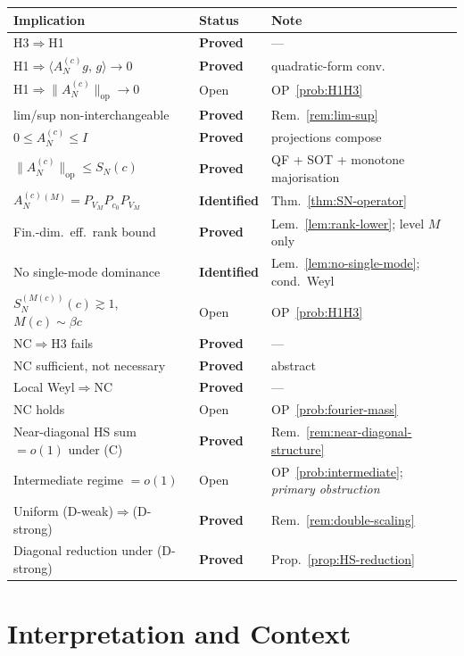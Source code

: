 \documentclass[12pt,a4paper]{amsart}
\theoremstyle{definition}
\theoremstyle{remark}
\newcommand{\norm}[1]{\|#1\|}
\newcommand{\ip}[2]{\langle #1,\, #2\rangle}
\newcommand{\Ac}{A_N^{(c)}}
\begin{document}
\begin{center}
\renewcommand{\arraystretch}{1.25}
\begin{tabular}{lll}
\toprule
Implication & Status & Note \\
\midrule
H3$\Rightarrow$H1
  & \textbf{Proved} & --- \\
H1$\Rightarrow\ip{\Ac g}{g}\to 0$
  & \textbf{Proved} & quadratic-form conv. \\
H1$\Rightarrow\norm{\Ac}_{\mathrm{op}}\to 0$
  & Open & OP~\ref{prob:H1H3} \\
lim/sup non-interchangeable
  & \textbf{Proved} & Rem.~\ref{rem:lim-sup} \\
$0\le\Ac\le I$
  & \textbf{Proved} & projections compose \\
$\norm{\Ac}_{\mathrm{op}}\le S_N(c)$
  & \textbf{Proved}
  & QF + SOT + monotone majorisation \\
$\Ac^{(M)}=P_{V_M}P_{c_0}P_{V_M}$
  & \textbf{Identified}
  & Thm.~\ref{thm:SN-operator} \\
Fin.-dim.\ eff.\ rank bound
  & \textbf{Proved}
  & Lem.~\ref{lem:rank-lower};
    level $M$ only \\
No single-mode dominance
  & \textbf{Identified}
  & Lem.~\ref{lem:no-single-mode};
    cond.\ Weyl \\
$S_N^{(M(c))}(c)\gtrsim 1$,
  $M(c)\sim\beta c$
  & Open
  & OP~\ref{prob:H1H3} \\
NC$\Rightarrow$H3 fails
  & \textbf{Proved} & --- \\
NC sufficient, not necessary
  & \textbf{Proved} & abstract \\
Local Weyl$\Rightarrow$NC
  & \textbf{Proved} & --- \\
NC holds
  & Open
  & OP~\ref{prob:fourier-mass} \\
Near-diagonal HS sum $=o(1)$ under (C)
  & \textbf{Proved}
  & Rem.~\ref{rem:near-diagonal-structure} \\
Intermediate regime $=o(1)$
  & Open
  & OP~\ref{prob:intermediate};
    \emph{primary obstruction} \\
Uniform (D-weak)$\Rightarrow$(D-strong)
  & \textbf{Proved}
  & Rem.~\ref{rem:double-scaling} \\
Diagonal reduction under (D-strong)
  & \textbf{Proved}
  & Prop.~\ref{prop:HS-reduction} \\
\bottomrule
\end{tabular}
\end{center}

\section{Interpretation and Context}
\label{sec:interp}
\end{document}
